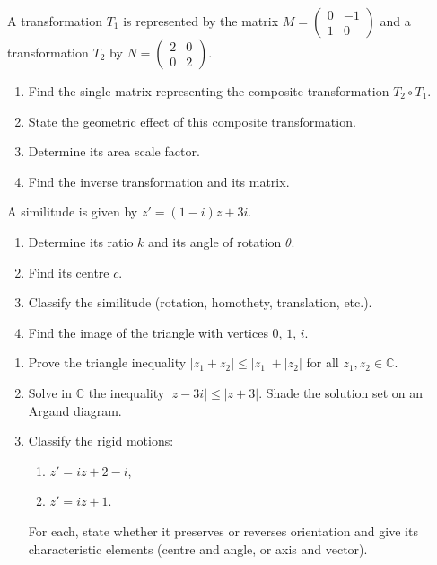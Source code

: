 \documentclass[11pt]{article}
\newcounter{popsec}
\newcounter{popsub}
\newcommand{\courssub}[1]{%
  \stepcounter{popsub}%
  \par\vspace{9pt}\noindent{\popxbold\fontsize{11.5}{13}\selectfont\color{popink}{\color{poporange}\thepopsec.\thepopsub}\hspace{6pt}#1}\par\nopagebreak\vspace{4pt}
}
\begin{document}
\courssub{I prepare for the GCE}
\begin{exercice}
A transformation $T_1$ is represented by the matrix $M = \begin{pmatrix} 0 & -1 \\ 1 & 0 \end{pmatrix}$ and a transformation $T_2$ by $N = \begin{pmatrix} 2 & 0 \\ 0 & 2 \end{pmatrix}$.
\begin{enumerate}
\item Find the single matrix representing the composite transformation $T_2 \circ T_1$.
\item State the geometric effect of this composite transformation.
\item Determine its area scale factor.
\item Find the inverse transformation and its matrix.
\end{enumerate}
\end{exercice}

\begin{exercice}
A similitude is given by $z' = (1 - i)z + 3i$.
\begin{enumerate}
\item Determine its ratio $k$ and its angle of rotation $\theta$.
\item Find its centre $c$.
\item Classify the similitude (rotation, homothety, translation, etc.).
\item Find the image of the triangle with vertices $0$, $1$, $i$.
\end{enumerate}
\end{exercice}

\begin{exercice}
\begin{enumerate}
\item Prove the triangle inequality $|z_1 + z_2| \le |z_1| + |z_2|$ for all $z_1, z_2 \in \mathbb{C}$.
\item Solve in $\mathbb{C}$ the inequality $|z - 3i| \le |z + 3|$. Shade the solution set on an Argand diagram.
\item Classify the rigid motions:
\begin{enumerate}
\item $z' = iz + 2 - i$,
\item $z' = i\overline{z} + 1$.
\end{enumerate}
For each, state whether it preserves or reverses orientation and give its characteristic elements (centre and angle, or axis and vector).
\end{enumerate}
\end{exercice}
\end{document}
